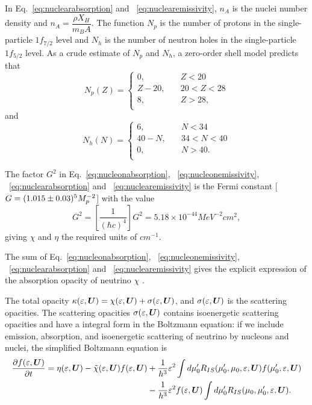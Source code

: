 \documentclass[10pt,preprint]{aastex}
\begin{document}
In Eq.~\eqref{eq:nuclearabsorption} and ~\eqref{eq:nuclearemissivity}, $n_A$ is the nuclei number density and $n_A = \dfrac{\rho X_H}{m_B A}$. The function $N_p$ is the number of protons in the single-particle $1f_{7/2}$ level and $N_h$ is the number of neutron holes in the single-particle $1f_{5/2}$ level. As a crude estimate of $N_p$ and $N_h$, a zero-order shell model predicts that
\[   
N_p(Z) = 
     \begin{cases}
       0, &\quad Z<20\\
       Z-20, &\quad 20<Z<28 \\
       8, &\quad Z>28,\\
     \end{cases}
\]
and
\[   
N_h(N) = 
     \begin{cases}
       6, &\quad N<34\\
       40-N, &\quad 34<N<40 \\
       0, &\quad N>40.\\
     \end{cases}
\]

The factor $G^2$ in Eq.~\eqref{eq:nucleonabsorption}, ~\eqref{eq:nucleonemissivity}, ~\eqref{eq:nuclearabsorption} and ~\eqref{eq:nuclearemissivity} is the Fermi constant [$G=(1.015\pm 0.03)\time 10^5 M_p^{-2}$] with the value
\begin{equation}
	G^2 = \left[ \dfrac{1}{(\hbar c)^4} \right] G^2 = 5.18 \times 10^{-44} MeV^{-2}cm^2, 
\end{equation}
giving $\chi$ and $\eta$ the required units of $cm^{-1}$.

The sum of Eq.~\eqref{eq:nucleonabsorption}, ~\eqref{eq:nucleonemissivity}, ~\eqref{eq:nuclearabsorption} and ~\eqref{eq:nuclearemissivity} gives the explicit expression of the absorption opacity of neutrino $\chi$ .

The total opacity $\kappa(\varepsilon,\boldsymbol{U})=\chi(\varepsilon,\boldsymbol{U})+\sigma(\varepsilon,\boldsymbol{U})$, and $\sigma(\varepsilon,\boldsymbol{U})$ is the scattering opacities. The scattering opacities $\sigma(\varepsilon,\boldsymbol{U})$ contains isoenergetic scattering opacities and have a integral form in the Boltzmann equation: if we include emission, absorption, and isoenergetic scattering of neutrino by nucleons and nuclei, the simplified Boltzmann equation is
\begin{align}
\dfrac{\partial f(\varepsilon,\boldsymbol{U})}{\partial t} = \eta(\varepsilon,\boldsymbol{U}) - \tilde{\chi}(\varepsilon,\boldsymbol{U})f(\varepsilon,\boldsymbol{U}) & + \dfrac{1}{h^3} \varepsilon^2 \int d\mu^\prime_0 R_{IS}( \mu^\prime_0, \mu_0,\varepsilon, \boldsymbol{U}) f(\mu^\prime_0, \varepsilon,\boldsymbol{U}) \nonumber \\
	& - \dfrac{1}{h^3} \varepsilon^2 f(\varepsilon,\boldsymbol{U})\int d\mu^\prime_0 R_{IS}(\mu_0, \mu^\prime_0, \varepsilon,\boldsymbol{U}) .
\end{align}
\end{document}
